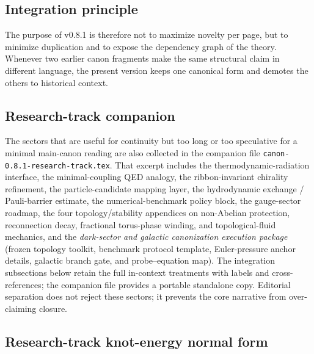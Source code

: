 \documentclass[11pt]{article}
\theoremstyle{definition}
\theoremstyle{plain}
\theoremstyle{remark}
\begin{document}
    \subsection{Integration principle}
        The purpose of v0.8.1 is therefore not to maximize novelty per page, but to minimize duplication and to expose the dependency graph of the theory. Whenever two earlier canon fragments make the same structural claim in different language, the present version keeps one canonical form and demotes the others to historical context.

    \subsection{Research-track companion}
        The sectors that are useful for continuity but too long or too speculative for a minimal main-canon reading are also collected in the companion file \texttt{canon-0.8.1-research-track.tex}. That excerpt includes the thermodynamic-radiation interface, the minimal-coupling QED analogy, the ribbon-invariant chirality refinement, the particle-candidate mapping layer, the hydrodynamic exchange / Pauli-barrier estimate, the numerical-benchmark policy block, the gauge-sector roadmap, the four topology/stability appendices on non-Abelian protection, reconnection decay, fractional torus-phase winding, and topological-fluid mechanics, and the \emph{dark-sector and galactic canonization execution package} (frozen topology toolkit, benchmark protocol template, Euler-pressure anchor details, galactic branch gate, and probe--equation map). The integration subsections below retain the full in-context treatments with labels and cross-references; the companion file provides a portable standalone copy. Editorial separation does not reject these sectors; it prevents the core narrative from over-claiming closure.

    \subsection{Research-track knot-energy normal form}
        \label{sec:research_track_knot_energy_normal_form}
\end{document}

